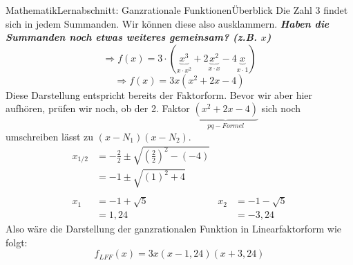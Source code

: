 \documentclass[11pt,twocolumn,oneside,openany,headings=optiontotoc,11pt,numbers=noenddot]{article}
\begin{document}
\begin{worksheet}{Mathematik}{Lernabschnitt: Ganzrationale Funktionen}{Überblick}
		Die Zahl \(3\) findet sich in jedem Summanden. Wir können diese also ausklammern. \textit{\textbf{\textit{Haben die Summanden noch etwas weiteres gemeinsam? (z.B. \(x\))}}}
		\[\Rightarrow f(x) = 3\cdot{}(\underbrace{x^3}_{x\cdot{}x^2} +2\underbrace{x^2}_{x\cdot{}x} -4\underbrace{x}_{x\cdot{}1})\]
		\[\Rightarrow f(x) = 3x(x^2 +2x -4)\]
		Diese Darstellung entspricht bereits der Faktorform. Bevor wir aber hier aufhören, prüfen wir noch, ob der 2. Faktor \(\underbrace{(x^2+2x-4)}_{pq-Formel}\) sich noch umschreiben lässt zu \((x-N_1)(x-N_2)\).\\
		\begin{align*}
			x_{1/2} & = -\frac{2}{2} \pm \sqrt{\left(\frac{2}{2}\right)^2 - (-4)}\\
			& = -1 \pm \sqrt{(1)^2 + 4}\\
			\\
			x_1 & = -1 + \sqrt{5} & x_2 & = -1 - \sqrt{5}\\
			& = 1,24 & & = -3,24
		\end{align*}
		Also wäre die Darstellung der ganzrationalen Funktion in Linearfaktorform wie folgt: \[f_{LFF}(x) = 3x(x-1,24)(x+3,24)\]
	\end{worksheet}
\end{document}
